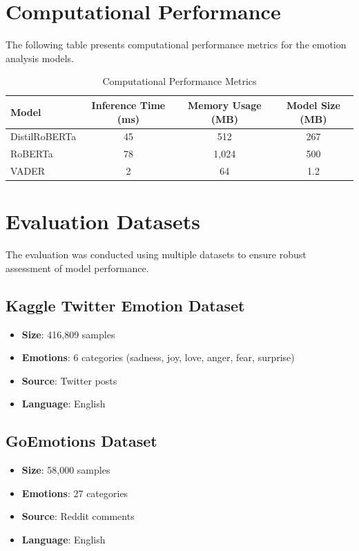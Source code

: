 \section{Computational Performance}

The following table presents computational performance metrics for the emotion analysis models.

\begin{table}[!htb]
\centering
\begin{tabular}{|l|c|c|c|}
\hline
\textbf{Model} & \textbf{Inference Time (ms)} & \textbf{Memory Usage (MB)} & \textbf{Model Size (MB)} \\
\hline
DistilRoBERTa & 45 & 512 & 267 \\
RoBERTa & 78 & 1,024 & 500 \\
VADER & 2 & 64 & 1.2 \\
\hline
\end{tabular}
\caption{Computational Performance Metrics}
\label{tab:computational_performance}
\end{table}


\section{Evaluation Datasets}

The evaluation was conducted using multiple datasets to ensure robust assessment of model performance.

\subsection{Kaggle Twitter Emotion Dataset}
\begin{itemize}
\item \textbf{Size}: 416,809 samples
\item \textbf{Emotions}: 6 categories (sadness, joy, love, anger, fear, surprise)
\item \textbf{Source}: Twitter posts
\item \textbf{Language}: English
\end{itemize}

\subsection{GoEmotions Dataset}
\begin{itemize}
\item \textbf{Size}: 58,000 samples
\item \textbf{Emotions}: 27 categories
\item \textbf{Source}: Reddit comments
\item \textbf{Language}: English
\end{itemize}

